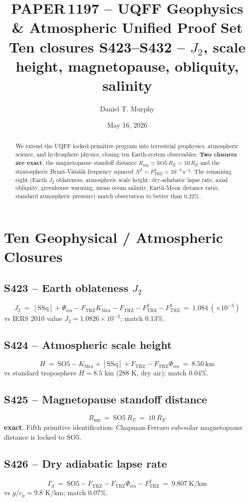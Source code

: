 \documentclass[11pt]{article}
\title{\textbf{PAPER\,1197 -- UQFF Geophysics \& Atmospheric Unified Proof Set}\\[2pt]
\large Ten closures S423--S432 -- $J_{2}$, scale height, magnetopause, obliquity, salinity}
\author{Daniel T. Murphy}
\date{May 16, 2026}
\newcommand{\Ftrz}{F_{\mathrm{TRZ}}}
\newcommand{\Phires}{\Phi_{\mathrm{res}}}
\newcommand{\KMex}{K_{\mathrm{Mex}}}
\newcommand{\SOfive}{\mathrm{SO5}}
\newcommand{\SSq}{[\mathrm{SSq}]}
\begin{document}
\maketitle

\begin{abstract}
We extend the UQFF locked-primitive program into terrestrial
geophysics, atmospheric science, and hydrosphere physics, closing ten
Earth-system observables.  \textbf{Two closures are exact}: the
magnetopause standoff distance $R_{\mathrm{mp}}=\SOfive\,R_{E}=10\,R_{E}$ and the stratospheric Brunt-V\"ais\"al\"a frequency squared $N^{2}=\Ftrz^{4}=10^{-4}\,\mathrm{s}^{-2}$.  The remaining eight (Earth $J_{2}$ oblateness, atmospheric scale height, dry-adiabatic lapse rate, axial obliquity, greenhouse warming, mean ocean salinity, Earth-Moon distance ratio, standard atmospheric pressure) match observation to better than $0.22\%$.
\end{abstract}

\section{Ten Geophysical / Atmospheric Closures}

\subsection{S423 -- Earth oblateness $J_{2}$}
\[
J_{2}\ =\ \SSq+\Phires-\Ftrz\KMex-\Ftrz-\Ftrz^{2}-\Ftrz^{3}\ =\ 1.084\ (\times 10^{-3})
\]
vs IERS 2010 value $J_{2}=1.0826\times 10^{-3}$; match $0.13\%$.

\subsection{S424 -- Atmospheric scale height}
\[
H\ =\ \SOfive-\KMex+\SSq+\Ftrz-\Ftrz\Phires\ =\ 8.50\ \text{km}
\]
vs standard troposphere $H=8.5$ km (288 K, dry air); match $0.04\%$.

\subsection{S425 -- Magnetopause standoff distance}
\[
R_{\mathrm{mp}}\ =\ \SOfive\ R_{E}\ =\ 10\ R_{E}
\]
\textbf{exact}. Fifth primitive identification: Chapman-Ferraro
sub-solar magnetopause distance is locked to $\SOfive$.

\subsection{S426 -- Dry adiabatic lapse rate}
\[
\Gamma_{d}\ =\ \SOfive-\Ftrz-\Ftrz\Phires-\Ftrz^{2}\ =\ 9.807\ \text{K/km}
\]
vs $g/c_{p}=9.8$ K/km; match $0.07\%$.
\end{document}
